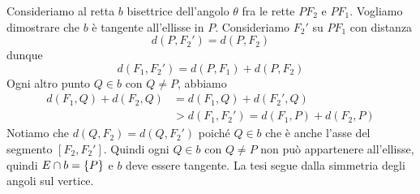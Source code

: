 \documentclass[a4paper]{article}
\begin{document}
\begin{snippetproof}{}
    \begin{figure}
        \begin{center}
        \end{center}
    \end{figure}
    Consideriamo al retta \(b\) bisettrice dell'angolo \(\theta\) fra le rette
    \(PF_2\) e \(PF_1\). Vogliamo dimostrare che \(b\) è tangente all'ellisse in \(P\).
    Consideriamo \(F_2'\) su \(PF_1\) con distanza
    \[
        d(P, F_2') = d(P, F_2)
    \]
    dunque
    \[
        d(F_1, F_2') = d(P, F_1) + d(P, F_2)
    \]
    Ogni altro punto \(Q \in b\) con \(Q \neq P\),
    abbiamo \begin{align*}
        d(F_1, Q) + d(F_2, Q)
        &= d(F_1, Q) + d(F_2', Q) \\
        &> d(F_1, F_2') = d(F_1, P) + d(F_2, P)
    \end{align*}
    Notiamo che \(d(Q, F_2) = d(Q, F_2')\) poiché
    \(Q \in b\) che è anche l'asse del segmento \([F_2, F_2']\).
    Quindi ogni \(Q \in b\) con \(Q \neq P\) non può appartenere all'ellisse,
    quindi \(E \cap b = \{P\}\) e \(b\) deve essere tangente. La tesi segue dalla simmetria
    degli angoli sul vertice.
    \wrapfill
\end{snippetproof}
\end{document}
